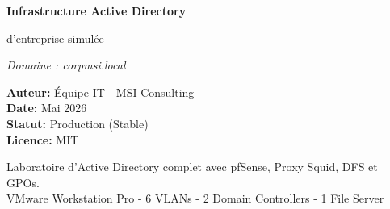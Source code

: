 \documentclass[12pt,a4paper]{report}
\begin{document}
\begin{titlepage}
    \centering
    \vspace*{2cm}
    
    {\Huge \bfseries Infrastructure Active Directory\\}
    
    \vspace{1.5cm}
    
    {\Large d'entreprise simulée}
    
    \vspace{1.5cm}
    
    {\large \textit{Domaine : corpmsi.local}}
    
    \vspace{3cm}
    
    
    \vspace{3cm}
    
    {\large
        \textbf{Auteur:} Équipe IT - MSI Consulting \\
        \textbf{Date:} Mai 2026 \\
        \textbf{Statut:} Production (Stable) \\
        \textbf{Licence:} MIT
    }
    
    \vfill
    
    {\small Laboratoire d'Active Directory complet avec pfSense, Proxy Squid, DFS et GPOs. \\
    VMware Workstation Pro - 6 VLANs - 2 Domain Controllers - 1 File Server}
    
\end{titlepage}

\tableofcontents
\newpage

\listoffigures
\newpage

\listoftables
\newpage













\end{document}
